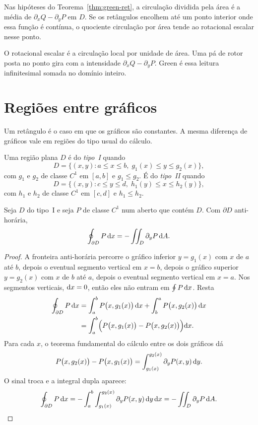 \documentclass[11pt,a4paper]{article}
\begin{document}
\begin{corolario}
\label{cor:media}
Nas hipóteses do Teorema~\ref{thm:green-ret}, a circulação dividida pela área é a média de $\partial_x Q-\partial_y P$ em $D$. Se os retângulos encolhem até um ponto interior onde essa função é contínua, o quociente circulação por área tende ao rotacional escalar nesse ponto.
\end{corolario}

O rotacional escalar é a circulação local por unidade de área. Uma pá de rotor posta no ponto gira com a intensidade $\partial_x Q-\partial_y P$. Green é essa leitura infinitesimal somada no domínio inteiro.

\section{Regiões entre gráficos}

Um retângulo é o caso em que os gráficos são constantes. A mesma diferença de gráficos vale em regiões do tipo usual do cálculo.

\begin{definicao}
Uma região plana $D$ é do \emph{tipo~I} quando
\[
D=\bigl\{(x,y):a\le x\le b,\; g_1(x)\le y\le g_2(x)\bigr\},
\]
com $g_1$ e $g_2$ de classe $C^1$ em $[a,b]$ e $g_1\le g_2$. É do \emph{tipo~II} quando
\[
D=\bigl\{(x,y):c\le y\le d,\; h_1(y)\le x\le h_2(y)\bigr\},
\]
com $h_1$ e $h_2$ de classe $C^1$ em $[c,d]$ e $h_1\le h_2$.
\end{definicao}

\begin{proposicao}
\label{prop:tipoI}
Seja $D$ do tipo~I e seja $P$ de classe $C^1$ num aberto que contém $D$. Com $\partial D$ anti-horária,
\[
\oint_{\partial D} P\,\mathrm{d} x=-\iint_D \partial_y P\,\mathrm{d} A.
\]
\end{proposicao}

\begin{proof}
A fronteira anti-horária percorre o gráfico inferior $y=g_1(x)$ com $x$ de $a$ até $b$, depois o eventual segmento vertical em $x=b$, depois o gráfico superior $y=g_2(x)$ com $x$ de $b$ até $a$, depois o eventual segmento vertical em $x=a$. Nos segmentos verticais, $\mathrm{d} x=0$, então eles não entram em $\oint P\,\mathrm{d} x$. Resta
\begin{align*}
\oint_{\partial D} P\,\mathrm{d} x
&=\int_a^b P\bigl(x,g_1(x)\bigr)\,\mathrm{d} x+\int_b^a P\bigl(x,g_2(x)\bigr)\,\mathrm{d} x\\
&=\int_a^b\Bigl(P\bigl(x,g_1(x)\bigr)-P\bigl(x,g_2(x)\bigr)\Bigr)\mathrm{d} x.
\end{align*}
Para cada $x$, o teorema fundamental do cálculo entre os dois gráficos dá
\[
P\bigl(x,g_2(x)\bigr)-P\bigl(x,g_1(x)\bigr)
=\int_{g_1(x)}^{g_2(x)}\partial_y P(x,y)\,\mathrm{d} y.
\]
O sinal troca e a integral dupla aparece:
\[
\oint_{\partial D} P\,\mathrm{d} x
=-\int_a^b\int_{g_1(x)}^{g_2(x)}\partial_y P(x,y)\,\mathrm{d} y\,\mathrm{d} x
=-\iint_D\partial_y P\,\mathrm{d} A.
\]
\end{proof}
\end{document}
